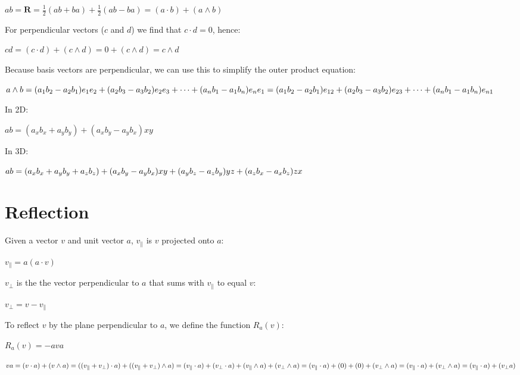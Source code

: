 \documentclass[14pt]{extarticle}
\begin{document}
\(
  ab
  = \mathbf{R}
  = \frac{1}{2} (ab + ba) + \frac{1}{2} (ab - ba)
  = (a \cdot b) + (a \wedge b)
\)

For perpendicular vectors (\(c\) and \(d\)) we find that \( c \cdot d = 0 \),
hence:

\( cd = (c \cdot d) + (c \wedge d) = 0 + (c \wedge d) = c \wedge d \)

Because basis vectors are perpendicular,
we can use this to simplify the outer product equation:

\(
  a \wedge b \\
  = (a_1 b_2 - a_2 b_1) e_1 e_2
  + (a_2 b_3 - a_3 b_2) e_2 e_3
  + \cdots
  + (a_n b_1 - a_1 b_n) e_n e_1 \\
  = (a_1 b_2 - a_2 b_1) e_{12}
  + (a_2 b_3 - a_3 b_2) e_{23}
  + \cdots
  + (a_n b_1 - a_1 b_n) e_{n1}
\)

In 2D:

\(
  ab
  = (a_x b_x + a_y b_y)
  + (a_x b_y - a_y b_x) xy
\)

In 3D:

\(
  ab \\
  = (a_x b_x + a_y b_y + a_z b_z)
  + (a_x b_y - a_y b_x) xy
  + (a_y b_z - a_z b_y) yz
  + (a_z b_x - a_x b_z) zx
\)

%
%

\pagebreak
\section{Reflection}
\label{sec:reflection}

Given a vector \(v\) and unit vector \(a\), \(v_\parallel\) is \(v\)
projected onto \(a\):

\( v_\parallel = a (a \cdot v) \)

\(v_\perp\) is the the vector perpendicular to \(a\) that sums with
\(v_\parallel\) to equal \(v\):

\( v_\perp = v - v_\parallel \)

To reflect \(v\) by the plane perpendicular to \(a\),
we define the function \(R_a(v)\):

\( R_a(v) = -ava \)

\(
  va \\
  = (v \cdot a) + (v \wedge a) \\
  = ((v_\parallel + v_\perp) \cdot a)
  + ((v_\parallel + v_\perp) \wedge a) \\
  = (v_\parallel \cdot a) + (v_\perp \cdot a)
  + (v_\parallel \wedge a) + (v_\perp \wedge a) \\
  = (v_\parallel \cdot a) + (0) + (0) + (v_\perp \wedge a) \\
  = (v_\parallel \cdot a) + (v_\perp \wedge a) \\
  = (v_\parallel \cdot a) + (v_\perp a)
\)
\end{document}
